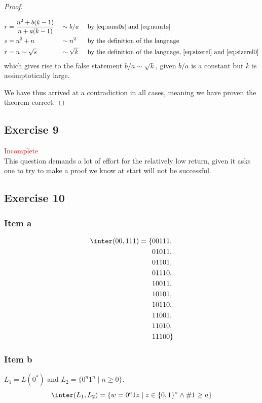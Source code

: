 {\begin{proof}
\begin{itemize}
\begin{alignat}{3}
		r &= \frac{n^2+b(k-1)}{n+a(k-1)} &&\sim b/a      &&\text{ by \eqref{eq:num0s} and \eqref{eq:num1s}} \\
		\label{eq:sizerel} s &= n^2+n    &&\sim n^2      &&\text{ by the definition of the language}\\
		r &= n \sim \sqrt{s}             &&\sim \sqrt{k} &&\text{ by  the definition of the language, \eqref{eq:sizerel} and \eqref{eq:sizerel0}}
	\end{alignat}
	which gives rise to the false statement $b/a \sim \sqrt{k}$, given $b/a$ is a constant but $k$ is assimptotically large.
\end{itemize}
We have thus arrived at a contradiction in all cases, meaning we have proven the theorem correct.
\end{proof}
\subsection{Exercise 9}
\textcolor{red}{Incomplete}\\
This question demands a lot of effort for the relatively low return, given it asks one to try to make a proof we know at start will not be successful.
\subsection{Exercise 10}
\subsubsection{Item a}
\begin{alignat*}{2}
	\inter(00,111)=\{&00111,\\
	&01011,\\
	&01101,\\
	&01110,\\
	&10011,\\
	&10101,\\
	&10110,\\
	&11001,\\
	&11010,\\
	&11100\}
\end{alignat*}
\subsubsection{Item b}
$L_1=L(0^*)$ and $L_2=\{0^n1^n\mid n\geq 0\}$.
\begin{equation*}
	\inter(L_1,L_2)=\{w=0^a1z\mid z \in \{0,1\}^* \wedge \#1\geq a\}
\end{equation*}
}
